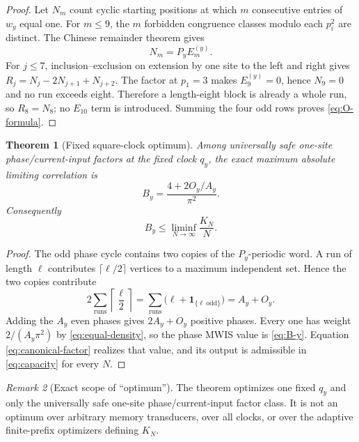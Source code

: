 \documentclass[11pt]{article}
\newtheorem{theorem}{Theorem}[section]
\theoremstyle{definition}
\theoremstyle{remark}
\newtheorem{remark}[theorem]{Remark}
\begin{document}
\begin{proof}
Let $N_m$ count cyclic starting positions at which $m$ consecutive entries
of $w_y$ equal one.  For $m\le9$, the $m$ forbidden congruence classes
modulo each $p_i^2$ are distinct.  The Chinese remainder theorem gives
\[
                         N_m=P_yE_m^{(y)}.
\]
For $j\le7$, inclusion--exclusion on extension by one site to the left and
right gives $R_j=N_j-2N_{j+1}+N_{j+2}$.  The factor at $p_1=3$ makes
$E_9^{(y)}=0$, hence $N_9=0$ and no run exceeds eight.  Therefore a
length-eight block is already a whole run, so $R_8=N_8$; no $E_{10}$ term is
introduced.  Summing the four odd rows proves \eqref{eq:O-formula}.
\end{proof}

\begin{theorem}[Fixed square-clock optimum]
Among universally safe one-site phase/current-input factors at the fixed
clock $q_y$, the exact maximum absolute limiting correlation is
\begin{equation}
             \boxed{B_y=\frac{4+2O_y/A_y}{\pi^2}}.
 \label{eq:B-y}
\end{equation}
Consequently
\begin{equation}
             B_y\le\liminf_{N\to\infty}\frac{K_N}{N}.
 \label{eq:fixed-floor}
\end{equation}
\end{theorem}

\begin{proof}
The odd phase cycle contains two copies of the $P_y$-periodic word.  A run of
length $\ell$ contributes $\lceil\ell/2\rceil$ vertices to a maximum
independent set.  Hence the two copies contribute
\[
 2\sum_{\mathrm{runs}}\left\lceil\frac\ell2\right\rceil
 =\sum_{\mathrm{runs}}\bigl(\ell+\mathbf1_{\{\ell\ \mathrm{odd}\}}\bigr)
 =A_y+O_y.
\]
Adding the $A_y$ even phases gives $2A_y+O_y$ positive phases.  Every one has
weight $2/(A_y\pi^2)$ by \eqref{eq:equal-density}, so the phase MWIS value is
\eqref{eq:B-y}.  Equation \eqref{eq:canonical-factor} realizes that value,
and its output is admissible in \eqref{eq:capacity} for every $N$.
\end{proof}

\begin{remark}[Exact scope of ``optimum'']
The theorem optimizes one fixed $q_y$ and only the universally safe one-site
phase/current-input factor class.  It is not an optimum over arbitrary
memory transducers, over all clocks, or over the adaptive finite-prefix
optimizers defining $K_N$.
\end{remark}
\end{document}
